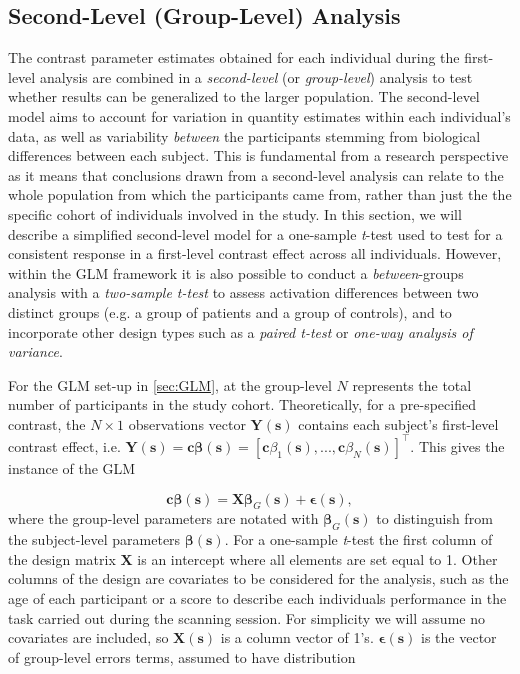 \subsection{Second-Level (Group-Level) Analysis}

The contrast parameter estimates obtained for each individual during the first-level analysis are combined in a \textit{second-level} (or \textit{group-level}) analysis to test whether results can be generalized to the larger population. The second-level model aims to account for variation in quantity estimates within each individual's data, as well as variability \textit{between} the participants stemming from biological differences between each subject.  This is fundamental from a research perspective as it means that conclusions drawn from a second-level analysis can relate to the whole population from which the participants came from, rather than just the the specific cohort of individuals involved in the study. In this section, we will describe a simplified second-level model for a one-sample \textit{t}-test used to test for a consistent response in a first-level contrast effect across all individuals. However, within the GLM framework it is also possible to conduct a \textit{between}-groups analysis with a \textit{two-sample t-test} to assess activation differences between two distinct groups (e.g. a group of patients and a group of controls), and to incorporate other design types such as a \textit{paired t-test} or \textit{one-way analysis of variance}.   

For the GLM set-up in \ref{sec:GLM}, at the group-level $N$ represents the total number of participants in the study cohort. Theoretically, for a pre-specified contrast, the $N \times 1$ observations vector $\bm{Y}(\bm{s})$ contains each subject's first-level contrast effect, i.e. $\bm{Y}(\bm{s}) = \bm{c}\bm{\beta}(\bm{s}) = [\bm{c}\beta_{1}(\bm{s}), ..., \bm{c}\beta_{N}(\bm{s})]^{\intercal}$. This gives the instance of the GLM 

\begin{equation}
\label{eq:theoretical_group_GLM}
\bm{c}\bm{\beta}(\bm{s}) = \bm{X}\bm{\beta}_{G}(\bm{s}) + \bm{\epsilon}(\bm{s}),
\end{equation}
where the group-level parameters are notated with $\bm{\beta}_{G}(\bm{s})$ to distinguish from the subject-level parameters $\bm{\beta}(\bm{s})$. For a one-sample \textit{t}-test the first column of the design matrix $\bm{X}$ is an intercept where all elements are set equal to 1. Other columns of the design are covariates to be considered for the analysis, such as the age of each participant or a score to describe each individuals performance in the task carried out during the scanning session. For simplicity we will assume no covariates are included, so $\bm{X}(\bm{s})$ is a column vector of 1's. $\bm{\epsilon}(\bm{s})$ is the vector of group-level errors terms, assumed to have distribution

